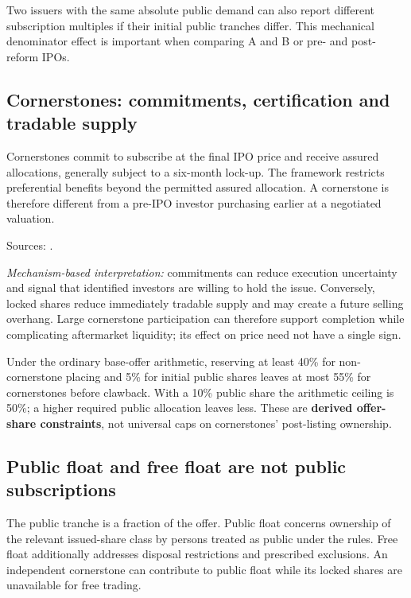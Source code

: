 \documentclass[11pt,a4paper]{article}
\newcommand{\source}[1]{\par{\footnotesize\color{ink}Sources: \cite{#1}.}\par}
\begin{document}
Two issuers with the same absolute public demand can also report different subscription multiples if their initial public tranches differ. This mechanical denominator effect is important when comparing A and B or pre- and post-reform IPOs.

\subsection{Cornerstones: commitments, certification and tradable supply}
Cornerstones commit to subscribe at the final IPO price and receive assured allocations, generally subject to a six-month lock-up. The framework restricts preferential benefits beyond the permitted assured allocation. A cornerstone is therefore different from a pre-IPO investor purchasing earlier at a negotiated valuation.\source{cornerfaq,cornerguide}

\textit{Mechanism-based interpretation:} commitments can reduce execution uncertainty and signal that identified investors are willing to hold the issue. Conversely, locked shares reduce immediately tradable supply and may create a future selling overhang. Large cornerstone participation can therefore support completion while complicating aftermarket liquidity; its effect on price need not have a single sign.

Under the ordinary base-offer arithmetic, reserving at least 40\% for non-cornerstone placing and 5\% for initial public shares leaves at most 55\% for cornerstones before clawback. With a 10\% public share the arithmetic ceiling is 50\%; a higher required public allocation leaves less. These are \textbf{derived offer-share constraints}, not universal caps on cornerstones' post-listing ownership.

\subsection{Public float and free float are not public subscriptions}
The public tranche is a fraction of the offer. Public float concerns ownership of the relevant issued-share class by persons treated as public under the rules. Free float additionally addresses disposal restrictions and prescribed exclusions. An independent cornerstone can contribute to public float while its locked shares are unavailable for free trading.
\end{document}

